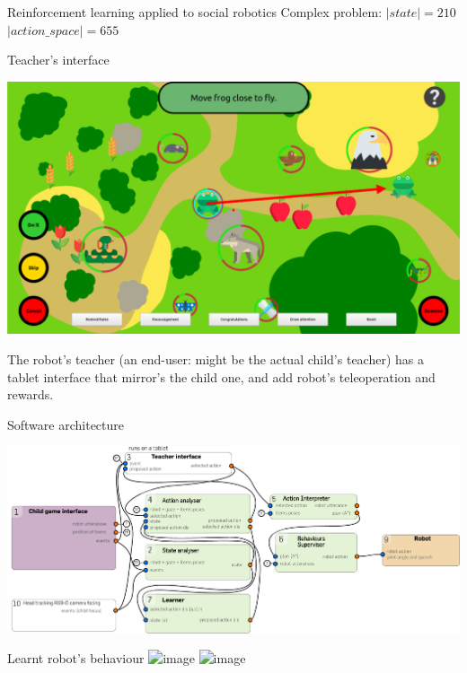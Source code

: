 \documentclass[compress,xcolor=table]{beamer}
\begin{document}
{\begin{frame}{Reinforcement learning applied to social robotics}
    Complex problem: 
    $|state| = 210$ $| action\_space| = 655$

\end{frame}

\begin{frame}{Teacher's interface}
    \begin{center}
        \includegraphics[width=0.9\linewidth]{sparc/woz-gui}
    \end{center}

    The robot's teacher (an end-user: might be the actual child's teacher) has a
    tablet interface that mirror's the child one, and add robot's teleoperation
    and rewards.
\end{frame}


\begin{frame}{Software architecture}
    \begin{center}
        \includegraphics[width=\linewidth]{figs/sparc/architecture}
    \end{center}
\end{frame}


\begin{frame}{Learnt robot's behaviour}
    \includegraphics<1>[width=0.9\linewidth]{sparc/actions-supervised}
    \includegraphics<2>[width=0.9\linewidth]{sparc/actions}



\end{frame}}
\end{document}
